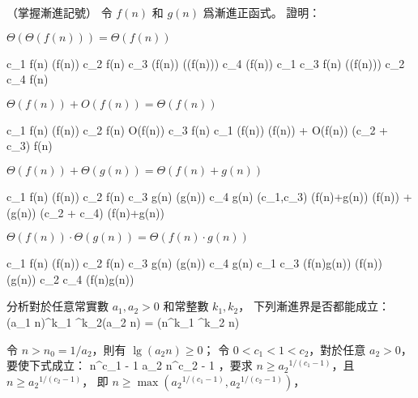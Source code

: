 \startPROBLEM
（掌握漸進記號）
令 $f(n)$ 和 $g(n)$ 爲漸進正函式。
證明：

\startigBase[a]\startitem
$\Theta(\Theta(f(n))) = \Theta(f(n))$
\stopitem\stopigBase

\startANSWER
\startsplitformula\startmathalignment[n=3]
\NC c_1 f(n) \le \NC \Theta(f(n)) \NC \le c_2 f(n) \NR
\NC c_3 \Theta(f(n)) \le \NC \Theta(\Theta(f(n))) \NC \le c_4 \Theta(f(n)) \NR
\NC c_1 c_3 f(n) \le \NC \Theta(\Theta(f(n))) \NC \le c_2 c_4 f(n) \NR
\stopmathalignment\stopsplitformula
\stopANSWER

\startigBase[continue]\startitem
$\Theta(f(n)) + O(f(n)) = \Theta(f(n))$
\stopitem\stopigBase

\startANSWER
\startsplitformula\startmathalignment[n=3]
\NC c_1 f(n) \le \NC \Theta(f(n)) \NC \le c_2 f(n) \NR
\NC \NC O(f(n)) \NC \le c_3 f(n) \NR
\NC c_1 \Theta(f(n)) \le \NC \Theta(f(n)) + O(f(n)) \NC \le (c_2 + c_3) f(n) \NR
\stopmathalignment\stopsplitformula
\stopANSWER

\startigBase[continue]\startitem
$\Theta(f(n)) + \Theta(g(n)) = \Theta(f(n)+g(n))$
\stopitem\stopigBase

\startANSWER
\startsplitformula\startmathalignment[n=3]
\NC c_1 f(n) \le \NC \Theta(f(n)) \NC \le c_2 f(n) \NR
\NC c_3 g(n) \le \NC \Theta(g(n)) \NC \le c_4 g(n) \NR
\NC \min(c_1,c_3) (f(n)+g(n)) \le
	 \NC \Theta(f(n)) + \Theta(g(n))
	 \NC \le \max(c_2 + c_4) (f(n)+g(n)) \NR
\stopmathalignment\stopsplitformula
\stopANSWER

\startigBase[continue]\startitem
$\Theta(f(n)) \cdot \Theta(g(n)) = \Theta(f(n) \cdot g(n))$
\stopitem\stopigBase

\startANSWER
\startsplitformula\startmathalignment[n=3]
\NC c_1 f(n) \le \NC \Theta(f(n)) \NC \le c_2 f(n) \NR
\NC c_3 g(n) \le \NC \Theta(g(n)) \NC \le c_4 g(n) \NR
\NC c_1 c_3 (f(n)\cdot g(n)) \le
	 \NC \Theta(f(n)) \cdot \Theta(g(n))
	 \NC \le c_2 c_4 (f(n)\cdot g(n)) \NR
\stopmathalignment\stopsplitformula
\stopANSWER

\startigBase[continue]\startitem
分析對於任意常實數 $a_1,a_2 > 0$ 和常整數 $k_1,k_2$，
下列漸進界是否都能成立：
\startformula
(a_1 n)^{k_1} \lg^{k_2}(a_2 n) = \Theta(n^{k_1} \lg^{k_2} n)
\stopformula
\stopitem\stopigBase

\startANSWER
令 $n>n_0=1/a_2$，則有 $\lg(a_2 n)\ge 0$；
令 $0 < c_1 < 1 < c_2$，對於任意 $a_2 > 0$，要使下式成立：
\startsplitformula\startmathalignment[n=3,align={right,middle,left}]
\NC n^{c_1 - 1} \le \NC a_2 \NC \le n^{c_2 - 1} \NR
\stopmathalignment\stopsplitformula
，要求 $n\ge {a_2}^{1/(c_1-1)}$，且 $n\ge {a_2}^{1/(c_2-1)}$，
即 $n \ge \max\left({a_2}^{1/(c_1-1)}, {a_2}^{1/(c_2-1)}\right)$，


